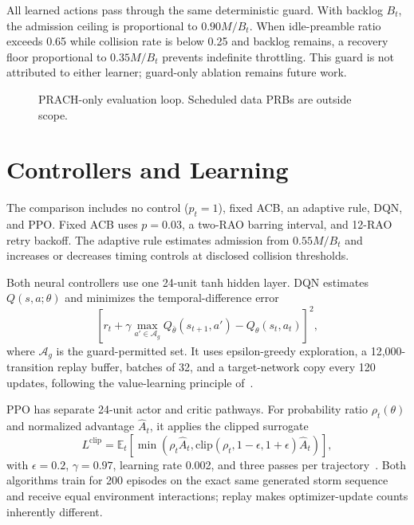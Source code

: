 \documentclass[conference]{IEEEtran}
\begin{document}
All learned actions pass through the same deterministic guard. With backlog $B_t$, the admission ceiling is proportional to $0.90M/B_t$. When idle-preamble ratio exceeds 0.65 while collision rate is below 0.25 and backlog remains, a recovery floor proportional to $0.35M/B_t$ prevents indefinite throttling. This guard is not attributed to either learner; guard-only ablation remains future work.

\begin{figure}[t]
\centering
{}
\caption{PRACH-only evaluation loop. Scheduled data PRBs are outside scope.}
\label{fig:flow}
\end{figure}

\section{Controllers and Learning}
The comparison includes no control ($p_t=1$), fixed ACB, an adaptive rule, DQN, and PPO. Fixed ACB uses $p=0.03$, a two-RAO barring interval, and 12-RAO retry backoff. The adaptive rule estimates admission from $0.55M/B_t$ and increases or decreases timing controls at disclosed collision thresholds.

Both neural controllers use one 24-unit tanh hidden layer. DQN estimates $Q(s,a;\theta)$ and minimizes the temporal-difference error
\begin{equation}
 \left[r_t+\gamma\max_{a'\in\mathcal A_g}Q_{\bar\theta}(s_{t+1},a')-Q_\theta(s_t,a_t)\right]^2,
\end{equation}
where $\mathcal A_g$ is the guard-permitted set. It uses epsilon-greedy exploration, a 12,000-transition replay buffer, batches of 32, and a target-network copy every 120 updates, following the value-learning principle of~\cite{mnih2015}.

PPO has separate 24-unit actor and critic pathways. For probability ratio $\rho_t(\theta)$ and normalized advantage $\hat A_t$, it applies the clipped surrogate
\begin{equation}
L^{\mathrm{clip}}=\mathbb E_t\!\left[\min\!\left(\rho_t\hat A_t,
\mathrm{clip}(\rho_t,1-\epsilon,1+\epsilon)\hat A_t\right)\right],
\end{equation}
with $\epsilon=0.2$, $\gamma=0.97$, learning rate 0.002, and three passes per trajectory~\cite{schulman2017}. Both algorithms train for 200 episodes on the exact same generated storm sequence and receive equal environment interactions; replay makes optimizer-update counts inherently different.
\end{document}
